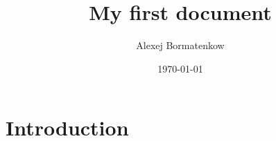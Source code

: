 \documentclass{article}
\title{My first document}
\author{Alexej Bormatenkow}
\date{\today}
\begin{document}
\maketitle

\section{Introduction}



\printbibliography
\end{document}
